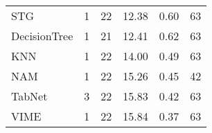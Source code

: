 \begin{tabular}{lrrrrr}
STG                &                  1 &  22 &  12.38 &                           0.60 &    63 \\
DecisionTree       &                  1 &  21 &  12.41 &                           0.62 &    63 \\
KNN                &                  1 &  22 &  14.00 &                           0.49 &    63 \\
NAM                &                  1 &  22 &  15.26 &                           0.45 &    42 \\
TabNet             &                  3 &  22 &  15.83 &                           0.42 &    63 \\
VIME               &                  1 &  22 &  15.84 &                           0.37 &    63 \\
\bottomrule
\end{tabular}
